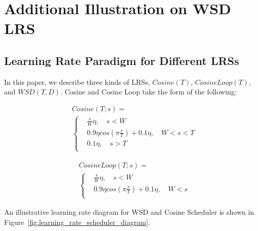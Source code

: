 \documentclass[dvipsnames]{article}
\begin{document}
\section{Additional Illustration on WSD LRS}
\subsection{Learning Rate Paradigm for Different LRSs}
\label{app:lrsequ}
In this paper, we describe three kinds of LRSs, $Cosine(T)$, $CosineLoop(T)$, and $WSD(T, D)$. 
Cosine and Cosine Loop take the form of the following:

\begin{figure}[htbp]
    \centering
    \begin{minipage}{0.47\linewidth}
        \begin{equation*}
    \begin{aligned}
    & Cosine(T; s) = \\
    & \begin{cases}
       & \frac{s}{W} \eta, \quad s<W \\
       & 0.9\eta cos(\pi \frac{s}{T}) + 0.1\eta, \quad W < s < T \\
       & 0.1\eta,\quad  s > T \\
    \end{cases}
\end{aligned}
        \end{equation*}
    \end{minipage}
    \hfill 
    \begin{minipage}{0.52\linewidth}
             \begin{equation*}
    \begin{aligned}
    & CosineLoop(T; s) = \\
    & \begin{cases}
       & \frac{s}{W} \eta, \quad s<W \\
       & 0.9\eta cos(\pi \frac{s}{T}) + 0.1\eta, \quad W < s  \\
    \end{cases}
\end{aligned}
        \end{equation*}
    \end{minipage}
\end{figure}

An illustrative learning rate diagram for WSD and Cosine Scheduler is shown in Figure~\ref{fig:learning_rate_scheduler_diagram}.
\end{document}
